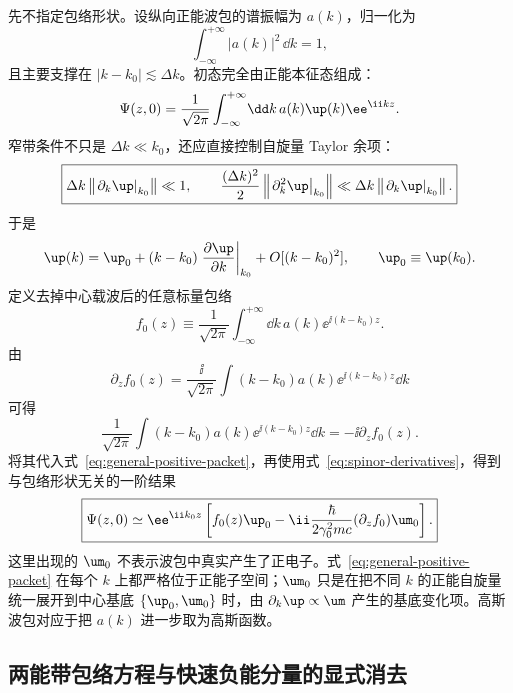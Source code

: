 先不指定包络形状。设纵向正能波包的谱振幅为 $a(k)$，归一化为
\begin{equation}
\int_{-\infty}^{+\infty}|a(k)|^2\,\dd k=1,
\end{equation}
且主要支撑在 $|k-k_0|\lesssim\Delta k$。初态完全由正能本征态组成：
\begin{equation}
\Psi(z,0)
=\frac{1}{\sqrt{2\pi}}
\int_{-\infty}^{+\infty}\!\dd k\,
 a(k)\up(k)\ee^{\ii kz}.
\label{eq:general-positive-packet}
\end{equation}
窄带条件不只是 $\Delta k\ll k_0$，还应直接控制自旋量 Taylor 余项：
\begin{equation}
\boxed{
\Delta k\left\|\left.\partial_k\up\right|_{k_0}\right\|\ll1,
\qquad
\frac{(\Delta k)^2}{2}
\left\|\left.\partial_k^2\up\right|_{k_0}\right\|
\ll
\Delta k\left\|\left.\partial_k\up\right|_{k_0}\right\|.}
\label{eq:spinor-taylor-condition}
\end{equation}
于是
\begin{equation}
\up(k)
=\up_0+(k-k_0)
\left.\frac{\partial\up}{\partial k}\right|_{k_0}
+O[(k-k_0)^2],
\qquad
\up_0\equiv\up(k_0).
\end{equation}
定义去掉中心载波后的任意标量包络
\begin{equation}
f_0(z)
\equiv
\frac{1}{\sqrt{2\pi}}
\int_{-\infty}^{+\infty}\!\dd k\,
 a(k)\ee^{\ii(k-k_0)z}.
\label{eq:general-envelope-Fourier}
\end{equation}
由
\begin{equation}
\partial_zf_0(z)
=\frac{\ii}{\sqrt{2\pi}}
\int (k-k_0)a(k)\ee^{\ii(k-k_0)z}\dd k
\end{equation}
可得
\begin{equation}
\frac{1}{\sqrt{2\pi}}
\int (k-k_0)a(k)\ee^{\ii(k-k_0)z}\dd k
=-\ii\partial_zf_0(z).
\end{equation}
将其代入式~\eqref{eq:general-positive-packet}，再使用式~\eqref{eq:spinor-derivatives}，得到与包络形状无关的一阶结果
\begin{equation}
\boxed{
\Psi(z,0)
\simeq
\ee^{\ii k_0z}
\left[
 f_0(z)\up_0
-\ii\frac{\hbar}{2\gamma_0^2mc}
 (\partial_zf_0)\um_0
\right].}
\label{eq:general-fixed-basis-packet}
\end{equation}
这里出现的 $\um_0$ 不表示波包中真实产生了正电子。式~\eqref{eq:general-positive-packet} 在每个 $k$ 上都严格位于正能子空间；$\um_0$ 只是在把不同 $k$ 的正能自旋量统一展开到中心基底 $\{\up_0,\um_0\}$ 时，由 $\partial_k\up\propto\um$ 产生的基底变化项。高斯波包对应于把 $a(k)$ 进一步取为高斯函数。

\subsection{两能带包络方程与快速负能分量的显式消去}

